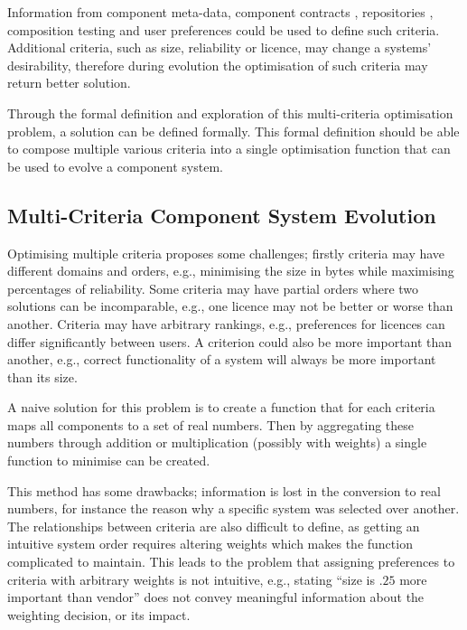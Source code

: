 Information from component meta-data, component contracts \cite{Watkins1999}, repositories \cite{Guo2000}, 
composition testing \cite{XuejieZhang2008} and user preferences could be used to define such criteria.
Additional criteria, such as size, reliability or licence, may change a systems' desirability, 
therefore during evolution the optimisation of such criteria may return better solution.

Through the formal definition and exploration of this multi-criteria optimisation problem,
a solution can be defined formally.
This formal definition should be able to compose multiple various criteria into a single optimisation function that can be used to evolve a component system.

\subsection{Multi-Criteria Component System Evolution}
Optimising multiple criteria proposes some challenges; firstly criteria may have different domains and orders, 
e.g., minimising the size in bytes while maximising percentages of reliability. 
Some criteria may have partial orders where two solutions can be incomparable,
e.g., one licence may not be better or worse than another.
Criteria may have arbitrary rankings, 
e.g., preferences for licences can differ significantly between users.
A criterion could also be more important than another, 
e.g., correct functionality of a system will always be more important than its size.

A naive solution for this problem is to create a function that for each criteria maps all components to a set of real numbers.
Then by aggregating these numbers through addition or multiplication (possibly with weights) a single function to minimise can be created. 

This method has some drawbacks; information is lost in the conversion to real numbers, for instance the reason why a specific system was selected over another.
The relationships between criteria are also difficult to define, as getting an intuitive system order requires altering weights which makes the function complicated to maintain.
This leads to the problem that assigning preferences to criteria with arbitrary weights is not intuitive,
e.g., stating ``size is $.25$ more important than vendor'' does not convey meaningful information about the weighting decision, or its impact.


